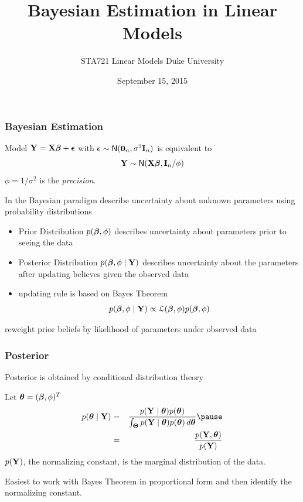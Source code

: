 \documentclass[]{beamer}
\title{Bayesian Estimation in Linear Models}
\institute{Merlise Clyde}
\author{STA721 Linear Models Duke University}
\date{September 15, 2015}
\begin{document}
\maketitle

\begin{frame}
  \frametitle{Bayesian Estimation}
  Model $\mathbf{Y} = \mathbf{X} \boldsymbol{\beta} + \boldsymbol{\epsilon}$  with $\boldsymbol{\epsilon} \sim \textsf{N}(\mathbf{0}_n , \sigma^2
  \mathbf{I}_n)$ \pause
is equivalent to 
$$
\mathbf{Y} \sim \textsf{N}(\mathbf{X} \boldsymbol{\beta}, \mathbf{I}_n/\phi)
$$
\pause
 $\phi = 1/\sigma^2$ is the {\it precision}.   
\pause

\vspace{14pt}
In the  Bayesian paradigm describe uncertainty about unknown
parameters using probability distributions
\pause
\begin{itemize}
\item  Prior Distribution $p(\boldsymbol{\beta}, \phi)$ describes uncertainty about
  parameters prior to seeing the data \pause
\item Posterior Distribution $p(\boldsymbol{\beta}, \phi \mid \mathbf{Y})$ describes
  uncertainty about the parameters after updating  believes given the
  observed data \pause
\item updating rule is based on Bayes Theorem
$$p(\boldsymbol{\beta}, \phi \mid \mathbf{Y}) \propto {\cal{L}}(\boldsymbol{\beta}, \phi) p(\boldsymbol{\beta}, \phi)$$
\pause
\end{itemize}
 reweight prior beliefs by likelihood of parameters  under observed data
\end{frame}

\begin{frame}
  \frametitle{Posterior}
  Posterior is obtained by conditional distribution theory \pause

  Let $\boldsymbol{\theta} = (\boldsymbol{\beta}, \phi)^T$ \pause
\begin{eqnarray*}
  p(\t \mid \Y ) & = & \frac{p(\Y \mid \t) p(\t) }
{ \int_{\T} p(\Y \mid \t)   p(\t) \, d\t} \pause \\
& = &  \frac{p(\Y, \t)}{p(\Y)}
\end{eqnarray*}
\pause
$p(\mathbf{Y})$, the normalizing constant, is the marginal distribution of the data.
\pause
\vfill

Easiest to work with Bayes Theorem in proportional form and then
identify the normalizing constant.
\end{frame}
\end{document}
